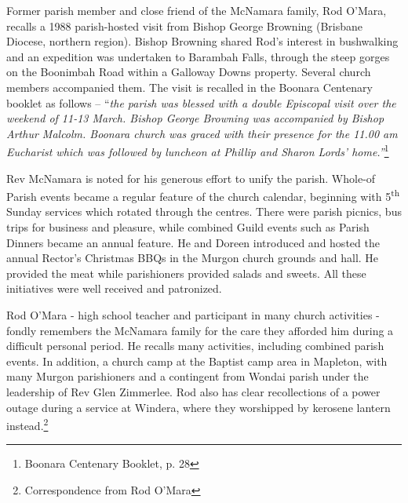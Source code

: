 Former parish member and close friend of the McNamara family, Rod O'Mara, recalls a 1988 parish-hosted visit from Bishop George Browning (Brisbane Diocese, northern region). Bishop Browning shared Rod's interest in bushwalking and an expedition was undertaken to Barambah Falls, through the steep gorges on the Boonimbah Road within a Galloway Downs property. Several church members accompanied them. The visit is recalled in the Boonara Centenary booklet as follows -- ``\emph{the parish was blessed with a double Episcopal visit over the weekend of 11-13 March. Bishop George Browning was accompanied by Bishop Arthur Malcolm. Boonara church was graced with their presence for the 11.00 am Eucharist which was followed by luncheon at Phillip and Sharon Lords' home.''}\footnote{Boonara Centenary Booklet, p. 28}


Rev McNamara is noted for his generous effort to unify the parish. Whole-of Parish events became a regular feature of the church calendar, beginning with 5\textsuperscript{th} Sunday services which rotated through the centres. There were parish picnics, bus trips for business and pleasure, while combined Guild events such as Parish Dinners became an annual feature. He and Doreen introduced and hosted the annual Rector's Christmas BBQs in the Murgon church grounds and hall. He provided the meat while parishioners provided salads and sweets. All these initiatives were well received and patronized.



Rod O'Mara - high school teacher and participant in many church activities - fondly remembers the McNamara family for the care they afforded him during a difficult personal period. He recalls many activities, including combined parish events. In addition, a church camp at the Baptist camp area in Mapleton, with many Murgon parishioners and a contingent from Wondai parish under the leadership of Rev Glen Zimmerlee. Rod also has clear recollections of a power outage during a service at Windera, where they worshipped by kerosene lantern instead.\footnote{Correspondence from Rod O'Mara}









